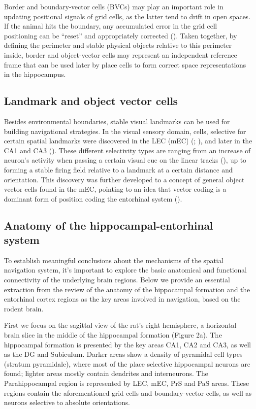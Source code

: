 Border and boundary-vector cells (BVCs) may play an important role in updating positional signals of grid cells, as the latter tend to drift in open spaces. If the animal hits the boundary, any accumulated error in the grid cell positioning can be “reset” and appropriately corrected (\cite{Hardcastle2015}). Taken together, by defining the perimeter and stable physical objects relative to this perimeter inside, border and object-vector cells may represent an independent reference frame that can be used later by place cells to form correct space representations in the hippocampus.


\subsection{Landmark and object vector cells}

Besides environmental boundaries, stable visual landmarks can be used for building navigational strategies. In the visual sensory domain, cells, selective for certain spatial landmarks were discovered in the LEC (mEC) (\cite{Deshmukh2011}; \cite{Kinkhabwala2020}), and later in the CA1 and CA3 (\cite{Deshmukh2013}). These different selectivity types are ranging from an increase of neuron’s activity when passing a certain visual cue on the linear tracks (\cite{Kinkhabwala2020}), up to forming a stable firing field relative to a landmark at a certain distance and orientation. This discovery was further developed to a concept of general object vector cells found in the mEC, pointing to an idea that vector coding is a dominant form of position coding the entorhinal system (\cite{Hooydal2019}).


\subsection{Anatomy of the hippocampal-entorhinal system}

To establish meaningful conclusions about the mechanisms of the spatial navigation system, it’s important to explore the basic anatomical and functional connectivity of the underlying brain regions. Below we provide an essential extraction from the review of the anatomy of the hippocampal formation and the entorhinal cortex regions as the key areas involved in navigation, based on the rodent brain.

First we focus on the sagittal view of the rat’s right hemisphere, a horizontal brain slice in the middle of the hippocampal formation (Figure 2a). The hippocampal formation is presented by the key areas CA1, CA2 and CA3, as well as the DG and Subiculum. Darker areas show a density of pyramidal cell types (stratum pyramidale), where most of the place selective hippocampal neurons are found; lighter areas mostly contain dendrites and interneurons. The Parahippocampal region is represented by LEC, mEC, PrS and PaS areas. These regions contain the aforementioned grid cells and boundary-vector cells, as well as neurons selective to absolute orientations.

